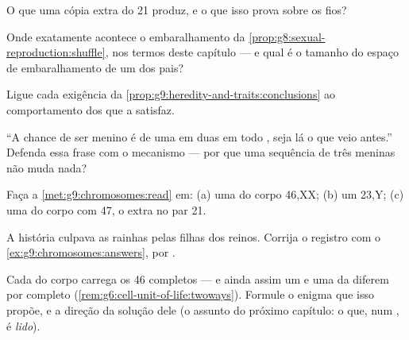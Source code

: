 \begin{exercise}[$\star$]\label{exo:g9:chromosomes:6}
O que uma cópia extra do  21 produz, e o que isso
prova sobre os fios?
\end{exercise}

\begin{exercise}[$\star\star$]\label{exo:g9:chromosomes:7}
Onde exatamente acontece o embaralhamento da
\cref{prop:g8:sexual-reproduction:shuffle}, nos termos deste
capítulo --- e qual é o tamanho do espaço de embaralhamento
de um dos pais?
\end{exercise}

\begin{exercise}[$\star\star$]\label{exo:g9:chromosomes:8}
Ligue cada exigência da
\cref{prop:g9:heredity-and-traits:conclusions} ao
comportamento dos  que a satisfaz.
\end{exercise}

\begin{exercise}[$\star\star$]\label{exo:g9:chromosomes:9}
``A chance de ser menino é de uma em duas em todo
, seja lá o que veio antes.'' Defenda essa frase
com o mecanismo --- por que uma sequência de três meninas
não muda nada?
\end{exercise}

\begin{exercise}[$\star\star$]\label{exo:g9:chromosomes:10}
Faça a \cref{met:g9:chromosomes:read} em: (a) uma  do
corpo 46,XX; (b) um  23,Y; (c) uma  do corpo com
47, o extra no par 21.
\end{exercise}

\begin{exercise}[$\star\star$]\label{exo:g9:chromosomes:11}
A história culpava as rainhas pelas filhas dos reinos.
Corrija o registro com o \cref{ex:g9:chromosomes:answers},
 por .
\end{exercise}

\begin{exercise}[$\star\star\star$]\label{exo:g9:chromosomes:12}
Cada  do corpo carrega os 46 completos --- e ainda
assim um  e uma  da  diferem por completo
(\cref{rem:g6:cell-unit-of-life:twoways}). Formule o enigma
que isso propõe, e a direção da solução dele (o assunto do
próximo capítulo: o que, num , é \emph{lido}).
\end{exercise}

